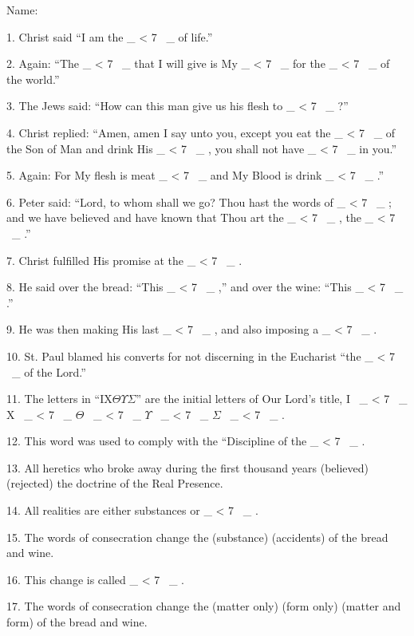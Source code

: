 \documentclass[a5paper]{article}
\title{}
\newcommand\textjarman[1]{{\jarman #1}}
\newcounter{z}
\newcommand\spaces[1]{ \_\loop \ifnum\value{z} < #1
~\_%
\stepcounter{z}%
\repeat%
\setcounter{z}{0}}
\begin{document}
\setlength{\parskip}{6pt plus2pt minus2pt}


\noindent Name:




1. Christ said “I am the \spaces{7} of life.” 

2. Again: “The \spaces{7}  that  I
will give is My \spaces{7} for the \spaces{7} of the world.” 

3. The  Jews  said:
“How can this man give us his flesh to \spaces{7}?” 

4. Christ replied:  “Amen,
amen I say unto you, except you eat the \spaces{7}  of  the  Son  of  Man  and
drink His \spaces{7}, you shall not have \spaces{7} in you.” 

5.  Again:  For  My
flesh is meat \spaces{7} and My Blood  is  drink  \spaces{7}.”  

6.  Peter  said:
“Lord, to whom shall we go? Thou hast the words of  \spaces{7};  and  we  have
believed and have known that  Thou  art  the  \spaces{7},  the  \spaces{7}.” 

7. 
Christ fulfilled His promise at the \spaces{7}. 

8. He  said  over  the  bread:
“This \spaces{7},” and over the wine: “This \spaces{7}.” 

9. He was  then  making
His last \spaces{7}, and also imposing a \spaces{7}. 

10.  St.  Paul  blamed  his
converts for not discerning in the Eucharist “the  \spaces{7}  of  the  Lord.”


11. The letters in “IX$\Theta\Upsilon\Sigma$” are the initial letters  of  Our  Lord's  title,
I~\spaces{7} X~\spaces{7} $\Theta$~\spaces{7} $\Upsilon$~\spaces{7} $\Sigma$~\spaces{7} . 

12. This word was used to  comply  with  the  “Discipline  of  the
\spaces{7}. 

13. All heretics who broke away during the  first  thousand  years
(\textjarman{believed}) (\textjarman{rejected}) the doctrine of the Real Presence. 

14.  All  realities
are either substances or \spaces{7}. 

15. The words of consecration change  the
(\textjarman{substance}) (\textjarman{accidents}) of the bread and wine. 

16.  This  change  is  called
\spaces{7}. 

17. The words of  consecration  change  the  (\textjarman{matter  only})  (\textjarman{form
only}) (\textjarman{matter and form}) of the  bread  and  wine.  
\end{document}
